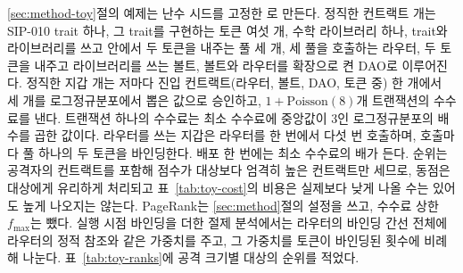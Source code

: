 \ref{sec:method-toy}절의 예제는 난수 시드를 고정한 로 만든다. 정직한 컨트랙트 \ToyContracts 개는 SIP-010 trait 하나, 그 trait를 구현하는 토큰 여섯 개, 수학 라이브러리 하나, trait와 라이브러리를 쓰고  안에서 두 토큰을 내주는 풀 세 개, 세 풀을 호출하는 라우터, 두 토큰을 내주고 라이브러리를 쓰는 볼트, 볼트와 라우터를 확장으로 켠 DAO로 이루어진다. 정직한 지갑 \ToyWallets 개는 저마다 진입 컨트랙트(라우터, 볼트, DAO, 토큰 중) 한 개에서 세 개를 로그정규분포에서 뽑은 값으로 승인하고, $1+\mathrm{Poisson}(8)$개 트랜잭션의 수수료를 낸다. 트랜잭션 하나의 수수료는 최소 수수료에 중앙값이 3인 로그정규분포의 배수를 곱한 값이다. 라우터를 쓰는 지갑은 라우터를 한 번에서 다섯 번 호출하며, 호출마다 풀 하나의 두 토큰을 바인딩한다. 배포 한 번에는 최소 수수료의 \ToyDeployFee 배가 든다. 순위는 공격자의 컨트랙트를 포함해 점수가 대상보다 엄격히 높은 컨트랙트만 세므로, 동점은 대상에게 유리하게 처리되고 표~\ref{tab:toy-cost}의 비용은 실제보다 낮게 나올 수는 있어도 높게 나오지는 않는다. PageRank는 \ref{sec:method}절의 설정을 쓰고, 수수료 상한 $f_{\max}$는 뺐다. 실행 시점 바인딩을 더한 절제 분석에서는 라우터의 바인딩 간선 전체에 라우터의 정적 참조와 같은 가중치를 주고, 그 가중치를 토큰이 바인딩된 횟수에 비례해 나눈다. 표~\ref{tab:toy-ranks}에 공격 크기별 대상의 순위를 적었다.

\begin{table}[htbp]
\centering
\caption{합성 예제에서 공격자 토큰이 전체 컨트랙트 가운데 차지하는 순위(1이 맨 위). $k$는 팜 컨트랙트(A1), 시빌 지갑(A2), 라우터 호출(A4)의 수이다. 열은 표~\ref{tab:toy-cost}의 점수 규칙으로, 차례로 서로 다른 호출자 수, 의존성 PageRank, 균등 재시작으로 Stacks에 옮긴 EndorseRank, \PCER, 실행 시점 trait 바인딩을 더한 .}
\label{tab:toy-ranks}
\small

\end{table}
